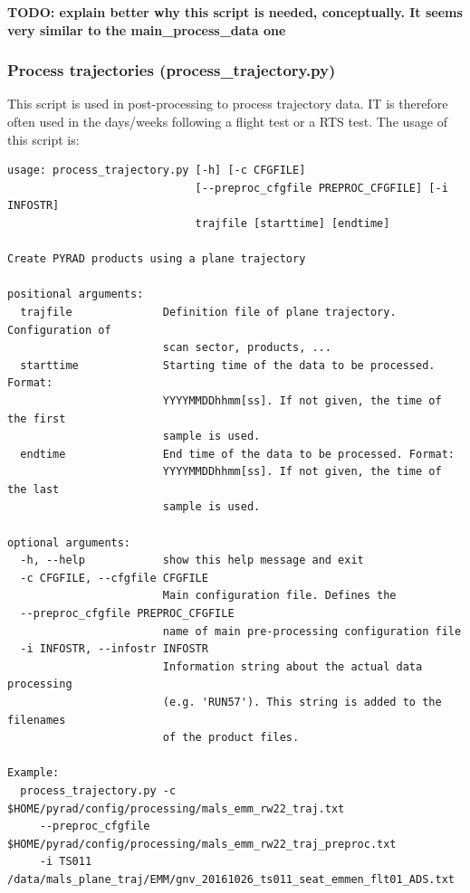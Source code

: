 \documentclass[a4paper,11pt,pdftex,twoside]{scrartcl}
\renewcommand{\bf}{\normalfont \bfseries}
\begin{document}
{\bf TODO: explain better why this script is needed, conceptually. It seems very similar to the main\_process\_data one}

\subsubsection{Process trajectories (process\_trajectory.py)}
This script is used in post-processing to process trajectory data. IT is therefore often used in the
days/weeks following a flight test or a RTS test.
The usage of this script is:

\begin{verbatim}
usage: process_trajectory.py [-h] [-c CFGFILE]
                             [--preproc_cfgfile PREPROC_CFGFILE] [-i INFOSTR]
                             trajfile [starttime] [endtime]

Create PYRAD products using a plane trajectory

positional arguments:
  trajfile              Definition file of plane trajectory. Configuration of
                        scan sector, products, ...
  starttime             Starting time of the data to be processed. Format:
                        YYYYMMDDhhmm[ss]. If not given, the time of the first
                        sample is used.
  endtime               End time of the data to be processed. Format:
                        YYYYMMDDhhmm[ss]. If not given, the time of the last
                        sample is used.

optional arguments:
  -h, --help            show this help message and exit
  -c CFGFILE, --cfgfile CFGFILE
                        Main configuration file. Defines the
  --preproc_cfgfile PREPROC_CFGFILE
                        name of main pre-processing configuration file
  -i INFOSTR, --infostr INFOSTR
                        Information string about the actual data processing
                        (e.g. 'RUN57'). This string is added to the filenames
                        of the product files.

Example:
  process_trajectory.py -c $HOME/pyrad/config/processing/mals_emm_rw22_traj.txt
     --preproc_cfgfile $HOME/pyrad/config/processing/mals_emm_rw22_traj_preproc.txt
     -i TS011 /data/mals_plane_traj/EMM/gnv_20161026_ts011_seat_emmen_flt01_ADS.txt

\end{verbatim}

\newpage
\end{document}
